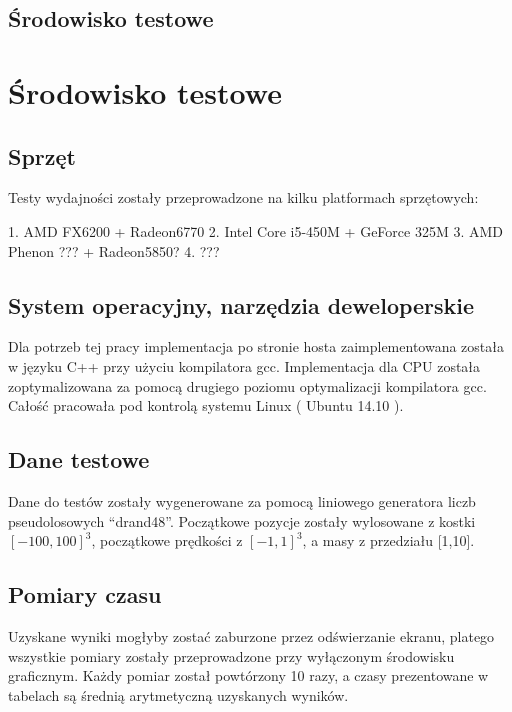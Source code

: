
\subsection {Środowisko testowe}

\section { Środowisko testowe }

\subsection {Sprzęt}

Testy wydajności zostały przeprowadzone na kilku platformach sprzętowych:

1. AMD FX6200 + Radeon6770
2. Intel Core i5-450M + GeForce 325M
3. AMD Phenon ??? + Radeon5850?
4. ???


\subsection {System operacyjny, narzędzia deweloperskie}
Dla potrzeb tej pracy implementacja po stronie hosta zaimplementowana została w języku C++ przy użyciu kompilatora gcc. Implementacja dla CPU została zoptymalizowana za pomocą drugiego poziomu optymalizacji kompilatora gcc. Całość pracowała pod kontrolą systemu Linux ( Ubuntu 14.10 ). 

\subsection {Dane testowe}
Dane do testów zostały wygenerowane za pomocą liniowego generatora liczb pseudolosowych ``drand48''. Początkowe pozycje zostały wylosowane z kostki $[-100, 100]^3$, początkowe prędkości z $[-1,1]^3$, a masy z przedziału [1,10].


\subsection {Pomiary czasu}

Uzyskane wyniki mogłyby zostać zaburzone przez odświerzanie ekranu, platego wszystkie pomiary zostały przeprowadzone przy wyłączonym środowisku graficznym. Każdy pomiar został powtórzony 10 razy, a czasy prezentowane w tabelach są średnią arytmetyczną uzyskanych wyników. 

